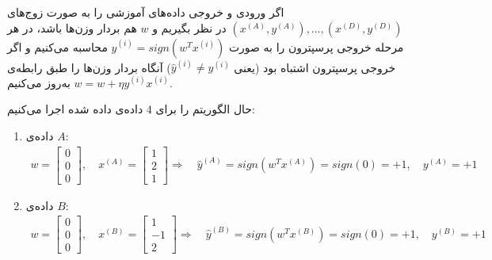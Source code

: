 \question{}

\begin{ابجد}
\item اگر ورودی و خروجی داده‌های آموزشی را به صورت زوج‌های $(x^{(A)}, y^{(A)}), \dots, (x^{(D)}, y^{(D)})$ در نظر بگیریم و $w$ هم بردار وزن‌ها باشد، در هر مرحله خروجی پرسپترون را به صورت $\hat{y}^{(i)} = sign(w^T x^{(i)})$ محاسبه می‌کنیم و اگر خروجی پرسپترون اشتباه بود (یعنی $\hat{y}^{(i)} \neq y^{(i)}$) آنگاه بردار وزن‌ها را طبق رابطه‌ی $w = w + \eta y^{(i)}x^{(i)}$ به‌روز می‌کنیم.

حال الگوریتم را برای 4 داده‌ی داده شده اجرا می‌کنیم:

\begin{enumerate}
    \item داده‌ی $A$:
          \begin{align*}
              w = \begin{bmatrix} 0 \\ 0 \\ 0 \end{bmatrix}, \quad x^{(A)} = \begin{bmatrix} 1 \\ 2 \\ 1 \end{bmatrix} \Rightarrow \quad \hat{y}^{(A)} = sign(w^T x^{(A)}) = sign(0) = +1, \quad y^{(A)} = +1
          \end{align*}

    \item داده‌ی $B$:
          \begin{align*}
              w = \begin{bmatrix} 0 \\ 0 \\ 0 \end{bmatrix}, \quad x^{(B)} = \begin{bmatrix} 1 \\ -1 \\ 2 \end{bmatrix} \Rightarrow \quad \hat{y}^{(B)} = sign(w^T x^{(B)}) = sign(0) = +1, \quad y^{(B)} = +1
          \end{align*}


\end{enumerate}
\end{ابجد}
